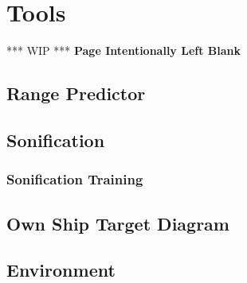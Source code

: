 \section{Tools}

\textcolor{commentGreen}{*** WIP ***}
\textbf{Page Intentionally Left Blank}
\subsection{Range Predictor}

\subsection{Sonification}

\subsubsection{Sonification Training}

\subsection{Own Ship Target Diagram}

\subsection{Environment}


\pagebreak